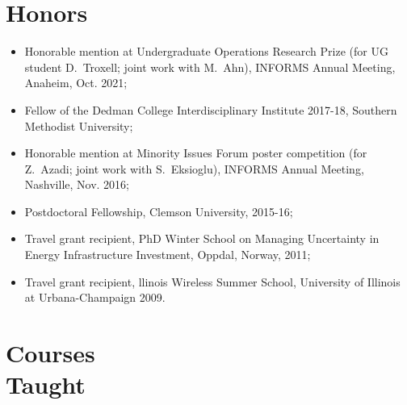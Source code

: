 \documentclass[hyperref, margin]{myResume}
\begin{document}
\begin{resume}
\section{Honors} 
\begin{itemize}[leftmargin=17pt]
	\item Honorable mention at Undergraduate Operations Research Prize (for UG student D.\ Troxell; joint work with M.\ Ahn), INFORMS Annual Meeting, Anaheim, Oct. 2021;
	\item Fellow of the Dedman College Interdisciplinary Institute 2017-18, Southern Methodist University;
	\item Honorable mention at Minority Issues Forum poster competition (for Z.\ Azadi\footnotemark[1]; joint work with S.\ Eksioglu), INFORMS Annual Meeting, Nashville, Nov. 2016;
	\item Postdoctoral Fellowship, Clemson University, 2015-16;
	\item Travel grant recipient, PhD Winter School on Managing Uncertainty in Energy Infrastructure Investment, Oppdal, Norway, 2011;
	\item Travel grant recipient, llinois Wireless Summer School, University of Illinois at Urbana-Champaign 2009.
\end{itemize}

\section{Courses\\Taught}
	

\end{resume}
\end{document}
